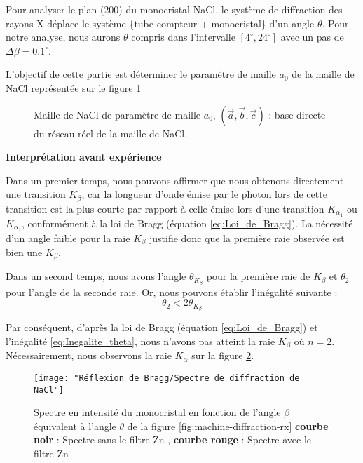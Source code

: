 Pour analyser le plan (200) du monocristal NaCl, le système de diffraction des rayons X déplace le système \{tube compteur + monocristal\} d'un angle $\theta$. Pour notre analyse, nous aurons $\theta$ compris dans l'intervalle $[4^\circ, 24^\circ]$ avec un pas de $\Delta \beta = 0.1^\circ$.






\newpage

L'objectif de cette partie est déterminer le paramètre de maille $a_0$ de la maille de NaCl représentée sur le figure \ref{fig:cristalnacl}
\begin{figure}[h!]
	\centering
	
	\caption{\centering Maille de NaCl de paramètre de maille $a_0$, $\left(\vec{a}, \vec{b}, \vec{c}\right)$ : base directe du réseau réel de la maille de NaCl.}
	\label{fig:cristalnacl}
\end{figure}







\begin{flushleft}
	\textbf{Interprétation avant expérience}
\end{flushleft}



Dans un premier temps, nous pouvons affirmer que nous obtenons directement une transition $K_{\beta}$, car la longueur d'onde émise par le photon lors de cette transition est la plus courte par rapport à celle émise lors d'une transition $K_{\alpha_1}$ ou $K_{\alpha_2}$, conformément à la loi de Bragg (équation \ref{eq:Loi_de_Bragg}). La nécessité d'un angle faible pour la raie $K_{\beta}$ justifie donc que la première raie observée est bien une $K_{\beta}$.

Dans un second temps, nous avons l'angle $\theta_{K_\beta}$ pour la première raie de $K_{\beta}$ et $\theta_2$ pour l'angle de la seconde raie. Or, nous pouvons établir l'inégalité suivante :
\begin{equation} \label{eq:Inegalite_theta}
	\theta_2 < 2\theta_{K_\beta}
\end{equation}

Par conséquent, d'après la loi de Bragg (équation \ref{eq:Loi_de_Bragg}) et l'inégalité \ref{eq:Inegalite_theta}, nous n'avons pas atteint la raie $K_{\beta}$ où $n=2$. Nécessairement, nous observons la raie $K_{\alpha}$ sur la figure \ref{fig:spectre-de-diffraction-de-nacl}.

\newpage
\begin{figure}
	\centering
	\texttt{[image: "Réflexion de Bragg/Spectre de diffraction de NaCl"]}
	\caption{\centering Spectre en intensité du monocristal en fonction de l'angle $\beta$ équivalent à l'angle $\theta$ de la figure \ref{fig:machine-diffraction-rx} \textbf{courbe noir} : Spectre sans le filtre Zn , {\color{red}\textbf{courbe rouge}} : Spectre avec le filtre Zn }
	\label{fig:spectre-de-diffraction-de-nacl}
\end{figure}


